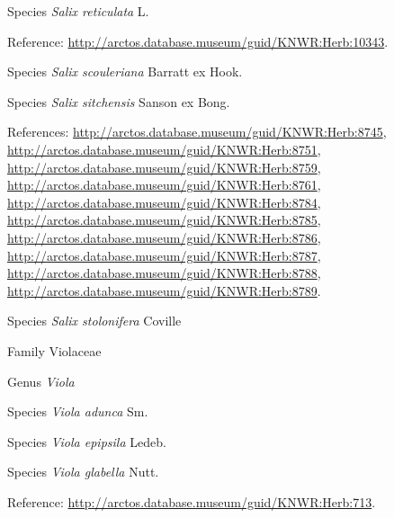 \documentclass[9pt, article]{memoir}
\begin{document}
\begin{multicols}{2}
\vspace{6pt}\noindent\hspace{36pt}Species \textit{Salix reticulata} L.


\vspace{6pt}Reference: 
\url{http://arctos.database.museum/guid/KNWR:Herb:10343}.

\vspace{6pt}\noindent\hspace{36pt}Species \textit{Salix scouleriana} Barratt ex Hook.


\vspace{6pt}\noindent\hspace{36pt}Species \textit{Salix sitchensis} Sanson ex Bong.


\vspace{6pt}References: 
\url{http://arctos.database.museum/guid/KNWR:Herb:8745}, 
\url{http://arctos.database.museum/guid/KNWR:Herb:8751}, 
\url{http://arctos.database.museum/guid/KNWR:Herb:8759}, 
\url{http://arctos.database.museum/guid/KNWR:Herb:8761}, 
\url{http://arctos.database.museum/guid/KNWR:Herb:8784}, 
\url{http://arctos.database.museum/guid/KNWR:Herb:8785}, 
\url{http://arctos.database.museum/guid/KNWR:Herb:8786}, 
\url{http://arctos.database.museum/guid/KNWR:Herb:8787}, 
\url{http://arctos.database.museum/guid/KNWR:Herb:8788}, 
\url{http://arctos.database.museum/guid/KNWR:Herb:8789}.

\vspace{6pt}\noindent\hspace{36pt}Species \textit{Salix stolonifera} Coville


\vspace{6pt}\noindent\hspace{24pt}Family Violaceae


\vspace{6pt}\noindent\hspace{30pt}Genus \textit{Viola}


\vspace{6pt}\noindent\hspace{36pt}Species \textit{Viola adunca} Sm.


\vspace{6pt}\noindent\hspace{36pt}Species \textit{Viola epipsila} Ledeb.


\vspace{6pt}\noindent\hspace{36pt}Species \textit{Viola glabella} Nutt.


\vspace{6pt}Reference: 
\url{http://arctos.database.museum/guid/KNWR:Herb:713}.


\end{multicols}
\end{document}
